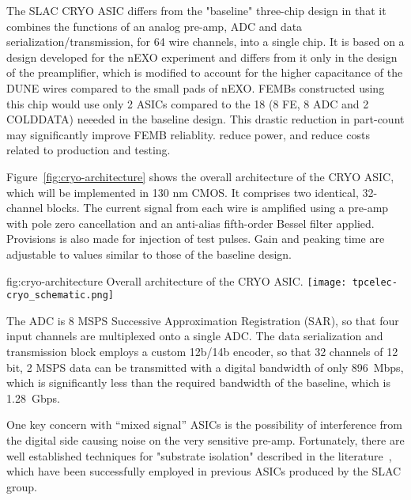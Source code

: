 The SLAC CRYO ASIC differs from the "baseline" three-chip design in that it combines the functions of an analog pre-amp, ADC and data serialization/transmission, for 64 wire channels, into a single chip.
It is based on a design developed for the nEXO experiment and differs from it only in the design of the preamplifier, which is modified to account for the higher capacitance of the DUNE wires compared to the small pads of nEXO.
FEMBs constructed using this chip would use only 2 ASICs compared to the 18 (8 FE, 8 ADC and 2 COLDDATA) neeeded in the baseline design.
This drastic reduction in part-count may significantly improve FEMB reliablity. reduce power, and reduce costs related to production and testing. 

Figure~\ref{fig:cryo-architecture} shows the overall architecture of the CRYO ASIC, which will be implemented in 130 nm CMOS.
It comprises two identical, 32-channel blocks. 
The current signal from each wire is amplified using a pre-amp with pole zero cancellation and an anti-alias fifth-order Bessel filter applied. 
Provisions is also made for injection of test pulses. 
Gain and peaking time are adjustable to values similar to those of the baseline design.

\begin{dunefigure}
{fig:cryo-architecture}
{Overall architecture of the CRYO ASIC.}
\texttt{[image: tpcelec-cryo\_schematic.png]}
\end{dunefigure}

The ADC is 8 MSPS Successive Approximation Registration (SAR), so that four input channels are multiplexed onto a single ADC. The data serialization and transmission block employs a custom 12b/14b encoder, so that 32 channels of 12 bit, 2 MSPS data can be transmitted with a digital bandwidth of only 896~Mbps, which is significantly less than the required bandwidth of the baseline, which is 1.28~Gbps.

One key concern with ``mixed signal'' ASICs is the possibility of interference from the digital side causing noise on the very sensitive pre-amp. 
Fortunately, there are well established techniques for "substrate isolation" described in the literature~\cite{yeh}, which have been successfully employed in previous ASICs produced by the SLAC group.%


